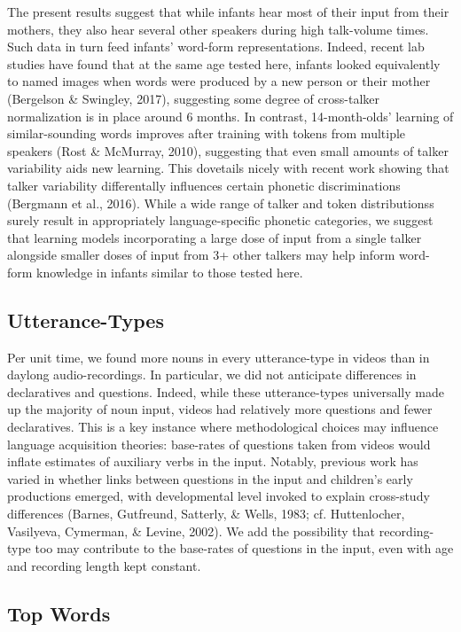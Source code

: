 \documentclass[man]{apa6}
\theoremstyle{definition}
\theoremstyle{definition}
\theoremstyle{definition}
\theoremstyle{remark}
\begin{document}
The present results suggest that while infants hear most of their input
from their mothers, they also hear several other speakers during high
talk-volume times. Such data in turn feed infants' word-form
representations. Indeed, recent lab studies have found that at the same
age tested here, infants looked equivalently to named images when words
were produced by a new person or their mother (Bergelson \& Swingley,
2017), suggesting some degree of cross-talker normalization is in place
around 6 months. In contrast, 14-month-olds' learning of
similar-sounding words improves after training with tokens from multiple
speakers (Rost \& McMurray, 2010), suggesting that even small amounts of
talker variability aids new learning. This dovetails nicely with recent
work showing that talker variability differentally influences certain
phonetic discriminations (Bergmann et al., 2016). While a wide range of
talker and token distributionss surely result in appropriately
language-specific phonetic categories, we suggest that learning models
incorporating a large dose of input from a single talker alongside
smaller doses of input from 3+ other talkers may help inform word-form
knowledge in infants similar to those tested here.

\subsection{Utterance-Types}\label{utterance-types}

Per unit time, we found more nouns in every utterance-type in videos
than in daylong audio-recordings. In particular, we did not anticipate
differences in declaratives and questions. Indeed, while these
utterance-types universally made up the majority of noun input, videos
had relatively more questions and fewer declaratives. This is a key
instance where methodological choices may influence language acquisition
theories: base-rates of questions taken from videos would inflate
estimates of auxiliary verbs in the input. Notably, previous work has
varied in whether links between questions in the input and children's
early productions emerged, with developmental level invoked to explain
cross-study differences (Barnes, Gutfreund, Satterly, \& Wells, 1983;
cf. Huttenlocher, Vasilyeva, Cymerman, \& Levine, 2002). We add the
possibility that recording-type too may contribute to the base-rates of
questions in the input, even with age and recording length kept
constant.

\subsection{Top Words}\label{top-words}
\end{document}
